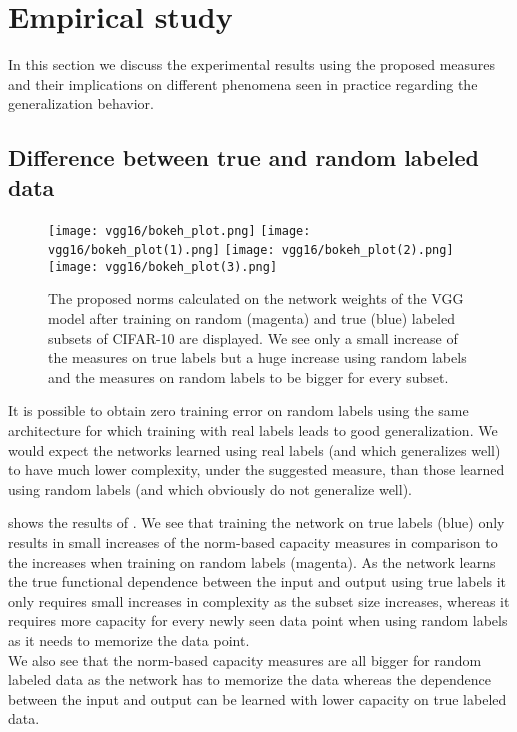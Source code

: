\section{Empirical study}
In this section we discuss the experimental results using the proposed measures and their implications on different phenomena seen in practice regarding the generalization behavior.

\subsection{Difference between true and random labeled data}
\begin{figure}
	\centering
	\texttt{[image: vgg16/bokeh\_plot.png]}
	\texttt{[image: vgg16/bokeh\_plot(1).png]}
	\texttt{[image: vgg16/bokeh\_plot(2).png]}
	\texttt{[image: vgg16/bokeh\_plot(3).png]}
	\caption{The proposed norms calculated on the network weights of the VGG model \cite{simonyan2014deep} after training on random (magenta) and true (blue) labeled subsets of CIFAR-10 are displayed. We see only a small increase of the measures on true labels but a huge increase using random labels and the measures on random labels to be bigger for every subset. }	
	\label{fig:norms-paper}
\end{figure}
It is possible to obtain zero training error on random labels using the same architecture for which training with real labels leads to good generalization. We would expect the networks learned using real labels (and which generalizes well) to have much lower complexity, under the suggested measure, than those learned using random labels (and which obviously do not generalize well). \cite{neyshabur2017exploring} \par
%
 shows the results of \cite{neyshabur2017exploring}. We see that training the network on true labels (blue) only results in small increases of the norm-based capacity measures in comparison to the increases when training on random labels (magenta). As the network learns the true functional dependence between the input and output using true labels it only requires small increases in complexity as the subset size increases, whereas it requires more capacity for every newly seen data point when using random labels as it needs to memorize the data point.\\
We also see that the norm-based capacity measures are all bigger for random labeled data as the network has to memorize the data whereas the dependence between the input and output can be learned with lower capacity on true labeled data.
%

